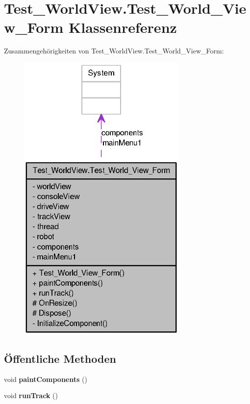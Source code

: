 \hypertarget{class_test___world_view_1_1_test___world___view___form}{
\section{Test\_\-WorldView.Test\_\-World\_\-View\_\-Form Klassenreferenz}
\label{class_test___world_view_1_1_test___world___view___form}
}


Zusammengehörigkeiten von Test\_\-WorldView.Test\_\-World\_\-View\_\-Form:\nopagebreak
\begin{figure}[H]
\begin{center}
\leavevmode
\includegraphics[width=238pt]{class_test___world_view_1_1_test___world___view___form__coll__graph}
\end{center}
\end{figure}
\subsection*{Öffentliche Methoden}
\begin{DoxyCompactItemize}
\item 
\hypertarget{class_test___world_view_1_1_test___world___view___form_a8219259ff399a2c4df82670aa28d74eb}{
void {\bfseries paintComponents} ()}
\label{class_test___world_view_1_1_test___world___view___form_a8219259ff399a2c4df82670aa28d74eb}

\item 
\hypertarget{class_test___world_view_1_1_test___world___view___form_ad60d74c9c1ba9fe17b000f26facc611d}{
void {\bfseries runTrack} ()}
\label{class_test___world_view_1_1_test___world___view___form_ad60d74c9c1ba9fe17b000f26facc611d}

\end{DoxyCompactItemize}
